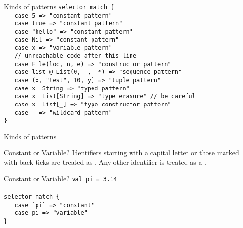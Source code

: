 \begin{frame}[fragile]{Kinds of patterns}
\lstinline!selector match {!\\
\lstinline!   case 5 => "constant pattern"!\\
\lstinline!   case true => "constant pattern"!\\
\lstinline!   case "hello" => "constant pattern"!\\
\lstinline!   case Nil => "constant pattern"!\\
\lstinline!   case x => "variable pattern"!\\
\lstinline!   // unreachable code after this line!\\
\lstinline!   case File(loc, n, e) => "constructor pattern"!\\
\lstinline!   case list @ List(0, _, _*) => "sequence pattern"!\\
\lstinline!   case (x, "test", 10, y) => "tuple pattern"!\\
\lstinline!   case x: String => "typed pattern"!\\
\lstinline!   case x: List[String] => "type erasure" // be careful!\\
\lstinline!   case x: List[_] => "type constructor pattern"!\\
\lstinline!   case _ => "wildcard pattern"!\\
\lstinline!}!
\end{frame}

\begin{frame}[fragile]{Kinds of patterns}
\begin{block}{Constant or Variable?}
Identifiers starting with a capital letter or those marked with back ticks are
treated as . Any other identifier is treated as a .
\end{block}
\pause
\begin{exampleblock}{Constant or Variable?}
\lstinline!val pi = 3.14!\\
\lstinline!!\\
\lstinline!selector match {!\\
\lstinline!   case `pi` => "constant"!\\
\lstinline!   case pi => "variable"!\\
\lstinline!}!
\end{exampleblock}
\end{frame}

